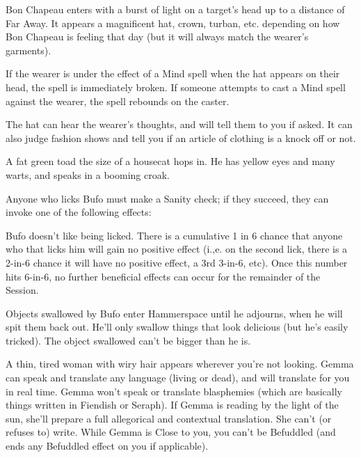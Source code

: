 
Bon Chapeau enters with a burst of light on a target's head up to a distance of Far Away.  It appears a magnificent hat, crown, turban, etc. depending on how Bon Chapeau is feeling that day (but it will always match the wearer's garments).  

If the wearer is under the effect of a Mind spell when the hat appears on their head, the spell is immediately broken.  If someone attempts to cast a Mind spell against the wearer, the spell rebounds on the caster. 

The hat can hear the wearer's thoughts, and will tell them to you if asked.  It can also judge fashion shows and tell you if an article of clothing is a knock off or not.


A fat green toad the size of a housecat hops in.  He has yellow eyes and many warts, and speaks in a booming croak. 

Anyone who licks Bufo must make a Sanity check; if they succeed, they can invoke one of the following effects:

Bufo doesn't like being licked.  There is a cumulative 1 in 6 chance that anyone who that licks him will gain no positive effect (i.,e.  on the second lick, there is a 2-in-6 chance it will have no positive effect, a 3rd 3-in-6, etc).  Once this number hits 6-in-6, no further beneficial effects can occur for the remainder of the Session.

Objects swallowed by Bufo enter Hammerspace until he adjourns, when he will spit them back out.  He'll only swallow things that look delicious (but he's easily tricked).  The object swallowed can't be bigger than he is.




A thin, tired woman with wiry hair appears wherever you're not looking.  Gemma can speak and translate any language (living or dead), and will translate for you in real time.  Gemma won't speak or translate blasphemies (which are basically things written in Fiendish or Seraph).  If Gemma is reading by the light of the sun, she'll prepare a full allegorical and contextual translation.  She can't (or refuses to) write.  While Gemma is Close to you, you can't be Befuddled (and ends any Befuddled effect on you if applicable).

